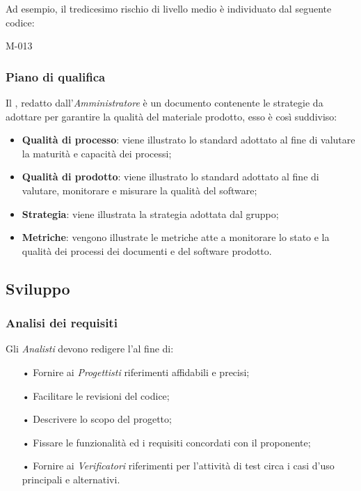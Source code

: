Ad esempio, il tredicesimo rischio di livello medio è individuato dal seguente codice:
\begin{center}
M-013
\end{center}

\subsubsection{Piano di qualifica}
Il \PdQ, redatto dall'\textit{Amministratore} è un documento contenente le strategie
da adottare per garantire la qualità del materiale prodotto, esso è così suddiviso:
\begin{itemize}
	\item \textbf{Qualità di processo}: viene illustrato lo standard adottato al fine di valutare la maturità e capacità dei processi;
	\item \textbf{Qualità di prodotto}: viene illustrato lo standard adottato al fine di valutare, monitorare e misurare la qualità del software;
	\item \textbf{Strategia}: viene illustrata la strategia adottata dal gruppo;	
	\item \textbf{Metriche}: vengono illustrate le metriche atte a monitorare lo stato e la qualità dei processi dei documenti e del software prodotto.

\end{itemize}

\subsection{Sviluppo}
\subsubsection{Analisi dei requisiti}
Gli \textit{Analisti} devono redigere l'\AdR  al fine di:
\begin{itemize}
    \item[•] Fornire ai \textit{Progettisti} riferimenti affidabili e precisi;
    \item[•] Facilitare le revisioni del codice;
    \item[•] Descrivere lo scopo del progetto;
    \item[•] Fissare le funzionalità ed i {requisiti} concordati con il proponente;
    \item[•] Fornire ai \textit{Verificatori} riferimenti per l'attività di test circa i casi d'uso principali e alternativi.
\end{itemize}

